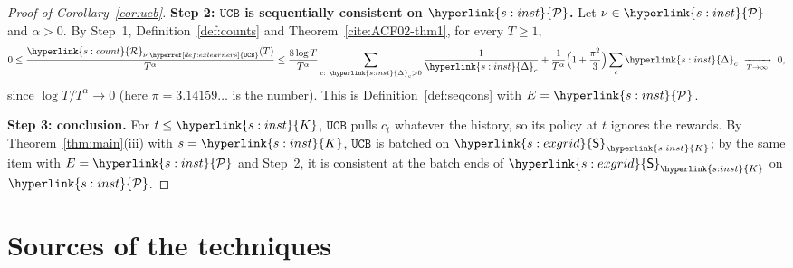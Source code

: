 \documentclass[11pt]{article}
\newcommand{\sy}[2]{{\hyperlink{#1}{#2}}}
\newcommand{\1}{\mathbf{1}}
\newcommand{\Kar}{\sy{s:inst}{K}}
\newcommand{\Dg}{\sy{s:inst}{\Delta}}
\newcommand{\cP}{\sy{s:inst}{\mathcal P}}
\newcommand{\Reg}{\sy{s:count}{\mathcal R}}
\newcommand{\Sq}{\sy{s:exgrid}{\mathsf S}}
\newcommand{\UCB}{\hyperref[def:exlearners]{\texttt{UCB}}}
\begin{document}
\begin{proof}[Proof of Corollary~\ref{cor:ucb}]
\textbf{Step 2: $\UCB$ is sequentially consistent on $\cP$.} Let $\nu\in\cP$ and $\alpha>0$. By
Step~1, Definition~\ref{def:counts} and Theorem~\ref{cite:ACF02-thm1}, for every $T\ge1$,
\begin{equation*}
  0\le\frac{\Reg_{\nu,\UCB}(T)}{T^\alpha}\le
  \frac{8\log T}{T^\alpha}\sum_{c:\ \Dg_c>0}\frac1{\Dg_c}+\frac1{T^\alpha}\Big(1+\frac{\pi^2}{3}\Big)\sum_{c}\Dg_c
  \ \xrightarrow[T\to\infty]{}\ 0,
\end{equation*}
since $\log T/T^\alpha\to0$ (here $\pi=3.14159\ldots$ is the number). This is Definition~\ref{def:seqcons} with $E=\cP$.

\textbf{Step 3: conclusion.} For $t\le\Kar$, $\UCB$ pulls $c_t$ whatever the history, so its policy
at $t$ ignores the rewards. By Theorem~\ref{thm:main}(iii) with $s=\Kar$, $\UCB$ is batched on
$\Sq_{\Kar}$; by the same item with $E=\cP$ and Step~2, it is consistent at the batch ends of
$\Sq_{\Kar}$ on $\cP$.
\end{proof}

\section{Sources of the techniques}\label{sec:attribution}
\end{document}
